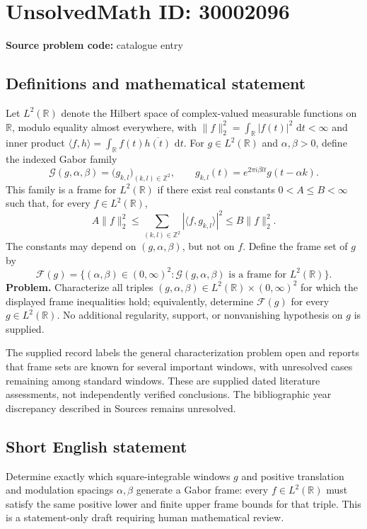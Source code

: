 \documentclass[11pt]{article}
\newcommand{\Z}{\mathbb{Z}}
\newcommand{\R}{\mathbb{R}}
\newcommand{\dd}{\,\mathrm{d}}
\begin{document}
\section*{UnsolvedMath ID: 30002096}
\textbf{Source problem code:} catalogue entry
\subsection{Definitions and mathematical statement}
Let \(L^2(\R)\) denote the Hilbert space of complex-valued measurable functions on \(\R\), modulo equality almost everywhere, with \(\|f\|_2^2=\int_{\R}|f(t)|^2\,\dd t<\infty\) and inner product \(\langle f,h\rangle=\int_{\R}f(t)\overline{h(t)}\,\dd t\). For \(g\in L^2(\R)\) and \(\alpha,\beta>0\), define the indexed Gabor family
\[
\mathcal G(g,\alpha,\beta)=\bigl(g_{k,l}\bigr)_{(k,l)\in\Z^2},\qquad
 g_{k,l}(t)=e^{2\pi i\beta lt}g(t-\alpha k).
\]
This family is a frame for \(L^2(\R)\) if there exist real constants \(0<A\leq B<\infty\) such that, for every \(f\in L^2(\R)\),
\[
 A\|f\|_2^2\leq
 \sum_{(k,l)\in\Z^2}|\langle f,g_{k,l}\rangle|^2
 \leq B\|f\|_2^2.
\]
The constants may depend on \((g,\alpha,\beta)\), but not on \(f\). Define the frame set of \(g\) by
\[
\mathcal F(g)=\{(\alpha,\beta)\in(0,\infty)^2:\mathcal G(g,\alpha,\beta)\text{ is a frame for }L^2(\R)\}.
\]
\textbf{Problem.} Characterize all triples \((g,\alpha,\beta)\in L^2(\R)\times(0,\infty)^2\) for which the displayed frame inequalities hold; equivalently, determine \(\mathcal F(g)\) for every \(g\in L^2(\R)\). No additional regularity, support, or nonvanishing hypothesis on \(g\) is supplied.

The supplied record labels the general characterization problem open and reports that frame sets are known for several important windows, with unresolved cases remaining among standard windows. These are supplied dated literature assessments, not independently verified conclusions. The bibliographic year discrepancy described in Sources remains unresolved.
\subsection{Short English statement}
Determine exactly which square-integrable windows \(g\) and positive translation and modulation spacings \(\alpha,\beta\) generate a Gabor frame: every \(f\in L^2(\R)\) must satisfy the same positive lower and finite upper frame bounds for that triple. This is a statement-only draft requiring human mathematical review.
\end{document}
